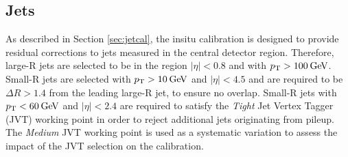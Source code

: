\subsection{Jets}
As described in Section \ref{sec:jetcal}, the \zjets insitu calibration is designed to provide residual corrections to jets measured in the central detector region. Therefore, large-R jets are selected to be in the region $|\eta|<0.8$ and with $p_{\text{T}}>100\hspace{2pt}\text{Ge\kern -0.1em V}$. Small-R jets are selected with $p_{\text{T}}>10\hspace{2pt}\text{Ge\kern -0.1em V}$ and $|\eta|<4.5$ and are required to be $\Delta R>1.4$ from the leading large-R jet, to ensure no overlap. Small-R jets with $p_{\text{T}}<60\hspace{2pt}\text{Ge\kern -0.1em V}$ and $|\eta|<2.4$ are required to satisfy the \textit{Tight} Jet Vertex Tagger (JVT) \cite{Insitu:JVT} working point in order to reject additional jets originating from pileup. The \textit{Medium} JVT working point is used as a systematic variation to assess the impact of the JVT selection on the calibration. %

